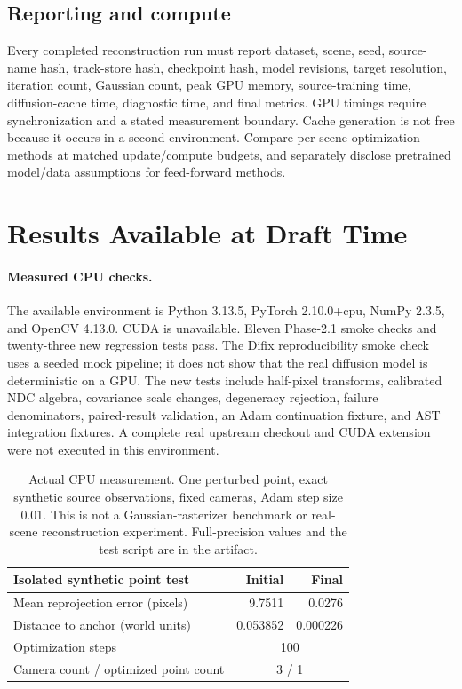 \documentclass[10pt,twocolumn,letterpaper]{article}
\begin{document}
\subsection{Reporting and compute}
Every completed reconstruction run must report dataset, scene, seed, source-name hash, track-store hash, checkpoint hash, model revisions, target resolution, iteration count, Gaussian count, peak GPU memory, source-training time, diffusion-cache time, diagnostic time, and final metrics. GPU timings require synchronization and a stated measurement boundary. Cache generation is not free because it occurs in a second environment. Compare per-scene optimization methods at matched update/compute budgets, and separately disclose pretrained model/data assumptions for feed-forward methods.

\section{Results Available at Draft Time}
\paragraph{Measured CPU checks.} The available environment is Python 3.13.5, PyTorch 2.10.0+cpu, NumPy 2.3.5, and OpenCV 4.13.0. CUDA is unavailable. Eleven Phase-2.1 smoke checks and twenty-three new regression tests pass. The Difix reproducibility smoke check uses a seeded mock pipeline; it does not show that the real diffusion model is deterministic on a GPU. The new tests include half-pixel transforms, calibrated NDC algebra, covariance scale changes, degeneracy rejection, failure denominators, paired-result validation, an Adam continuation fixture, and AST integration fixtures. A complete real upstream checkout and CUDA extension were not executed in this environment.

\begin{table}[t]
\centering\small
\begin{tabular}{lrr}
\toprule
Isolated synthetic point test & Initial & Final\\
\midrule
Mean reprojection error (pixels) & 9.7511 & 0.0276\\
Distance to anchor (world units) & 0.053852 & 0.000226\\
Optimization steps & \multicolumn{2}{c}{100}\\
Camera count / optimized point count & \multicolumn{2}{c}{3 / 1}\\
\bottomrule
\end{tabular}
\caption{Actual CPU measurement. One perturbed point, exact synthetic source observations, fixed cameras, Adam step size 0.01. This is not a Gaussian-rasterizer benchmark or real-scene reconstruction experiment. Full-precision values and the test script are in the artifact.}
\label{tab:synthetic}
\end{table}
\end{document}
